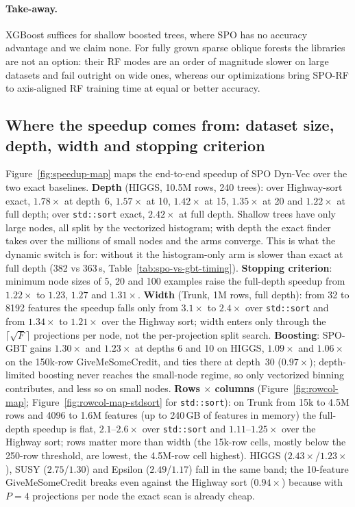 \paragraph{Take-away.}
XGBoost suffices for shallow boosted trees, where SPO has no accuracy advantage and we claim
none. For fully grown sparse oblique forests the libraries are not an option: their RF modes are
an order of magnitude slower on large datasets and fail outright on wide ones, whereas our
optimizations bring SPO-RF to axis-aligned RF training time at equal or better accuracy.

\subsection{Where the speedup comes from: dataset size, depth, width and stopping criterion}
\label{sec:speedup-map}

Figure~\ref{fig:speedup-map} maps the end-to-end speedup of SPO Dyn-Vec over the two exact
baselines. \textbf{Depth} (HIGGS, 10.5M rows, 240 trees): over Highway-sort exact, $1.78\times$
at depth~6, $1.57\times$ at 10, $1.42\times$ at 15, $1.35\times$ at 20 and $1.22\times$ at
full depth; over \texttt{std::sort} exact, $2.42\times$ at full depth. Shallow trees have only
large nodes, all split by the vectorized histogram; with depth the exact finder takes over the
millions of small nodes and the arms converge. This is what the dynamic switch is for: without
it the histogram-only arm is slower than exact at full depth (382 vs 363\,s,
Table~\ref{tab:spo-vs-gbt-timing}). \textbf{Stopping criterion}: minimum node sizes of 5, 20
and 100 examples raise the full-depth speedup from $1.22\times$ to $1.23$, $1.27$ and
$1.31\times$. \textbf{Width} (Trunk, 1M rows, full depth): from 32 to 8192 features the speedup
falls only from $3.1\times$ to $2.4\times$ over \texttt{std::sort} and from $1.34\times$ to
$1.21\times$ over the Highway sort; width enters only through the $\lceil\sqrt{F}\rceil$
projections per node, not the per-projection split search. \textbf{Boosting}: SPO-GBT gains
$1.30\times$ and $1.23\times$ at depths 6 and 10 on HIGGS, $1.09\times$ and $1.06\times$ on the
150k-row GiveMeSomeCredit, and ties there at depth~30 ($0.97\times$); depth-limited boosting
never reaches the small-node regime, so only vectorized binning contributes, and less so on
small nodes. \textbf{Rows $\times$ columns} (Figure~\ref{fig:rowcol-map};
Figure~\ref{fig:rowcol-map-stdsort} for \texttt{std::sort}): on Trunk from 15k to 4.5M rows and
4096 to 1.6M features (up to 240\,GB of features in memory) the full-depth speedup is flat,
$2.1$--$2.6\times$ over \texttt{std::sort} and $1.11$--$1.25\times$ over the Highway sort; rows
matter more than width (the 15k-row cells, mostly below the 250-row threshold, are lowest, the
4.5M-row cell highest). HIGGS ($2.43\times$/$1.23\times$), SUSY ($2.75$/$1.30$) and Epsilon
($2.49$/$1.17$) fall in the same band; the 10-feature GiveMeSomeCredit breaks even against the
Highway sort ($0.94\times$) because with $P=4$ projections per node the exact scan is already
cheap.

